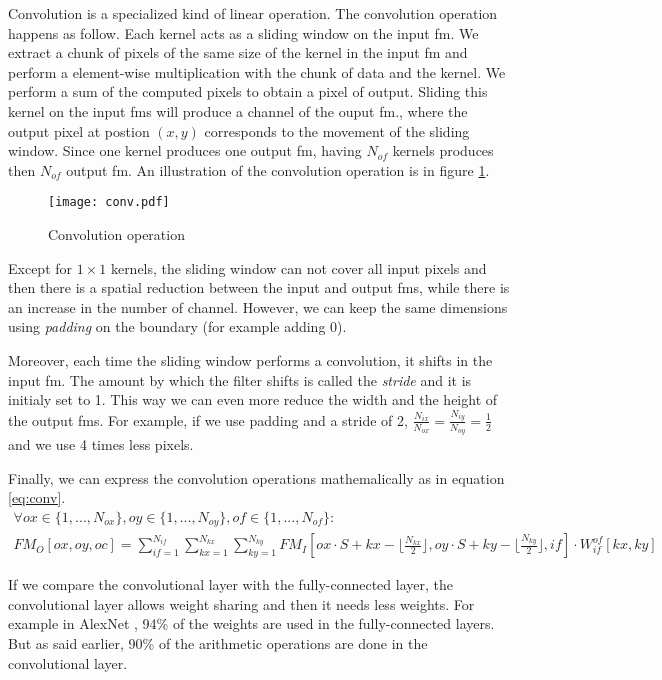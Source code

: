 Convolution is a specialized kind of linear operation. The convolution operation happens as follow. Each kernel acts as a sliding window on the input \acrshort{fm}. We extract a chunk of pixels of the same size of the kernel in the input \acrshort{fm} and perform a element-wise multiplication with the chunk of data and the kernel. We perform a sum of the computed pixels to obtain a pixel of output. Sliding this kernel on the input \acrshort{fm}s will produce a channel of the ouput \acrshort{fm}., where the output pixel at postion $(x, y)$ corresponds to the movement of the sliding window. Since one kernel produces one output \acrshort{fm}, having $N_{of}$ kernels produces then $N_{of}$ output \acrshort{fm}. An illustration of the convolution operation is in figure \ref{fig:convolution}.
%
\begin{figure}
    \centering
    \texttt{[image: conv.pdf]}
    \caption{Convolution operation}
    \label{fig:convolution}
\end{figure}

Except for $1 \times 1$ kernels, the sliding window can not cover all input pixels and then there is a spatial reduction between the input and output \acrshort{fm}s, while there is an increase in the number of channel. However, we can keep the same dimensions using \textit{padding} on the boundary (for example adding 0).

Moreover, each time the sliding window performs a convolution, it shifts in the input \acrshort{fm}. The amount by which the filter shifts is called the \textit{stride} and it is initialy set to 1. This way we can even more reduce the width and the height of the output \acrshort{fm}s. For example, if we use padding and a stride of 2, $\frac{N_{ix}}{N_{ox}} = \frac{N_{iy}}{N_{oy}} = \frac{1}{2}$ and we use 4 times less pixels.

Finally, we can express the convolution operations mathemalically as in equation \eqref{eq:conv}.
    \begin{multline}
        \forall ox \in \{ 1, ..., N_{ox} \}, oy \in \{ 1, ..., N_{oy} \}, of \in \{ 1, ..., N_{of} \} : \\
        FM_O[ox, oy, oc] = \sum^{N_{if}}_{if=1}
        \sum^{N_{kx}}_{kx=1}
        \sum^{N_{ky}}_{ky=1}
        FM_I[ox \cdot S + kx - \lfloor \frac{N_{kx}}{2} \rfloor,  oy \cdot S + ky - \lfloor \frac{N_{ky}}{2} \rfloor, if] \cdot
        W^{of}_{if}[kx, ky]
        \label{eq:conv}
    \end{multline}

If we compare the convolutional layer with the fully-connected layer, the convolutional layer allows weight sharing and then it needs less weights. For example in AlexNet \cite{krizhevsky_imagenet_2012}, 94\% of the weights are used in the fully-connected layers. But as said earlier, 90\% of the arithmetic operations are done in the convolutional layer.
